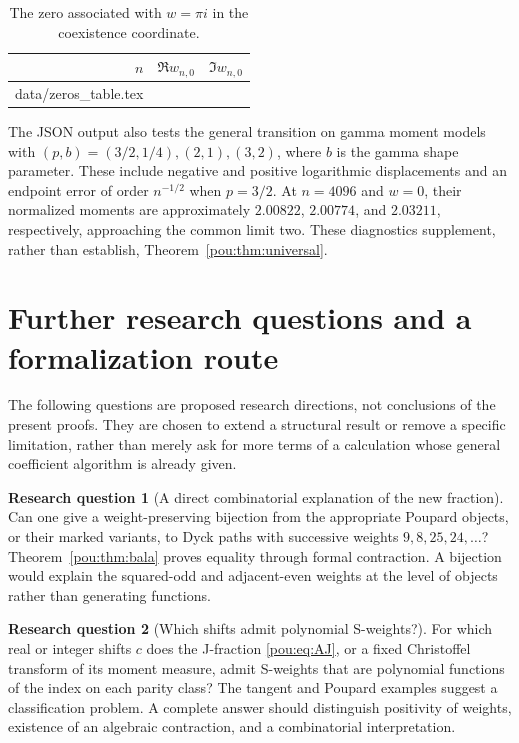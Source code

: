\documentclass[11pt]{article}
\makeatletter
\theoremstyle{definition}
\newtheorem{question}{Research question}
\theoremstyle{remark}
\newcommand{\tableinput}[1]{\@@input #1 }
\makeatother
\begin{document}
\begin{table}[htbp]
\centering
\caption{The zero associated with $w=\pi i$ in the coexistence coordinate.}
\label{pou:tab:zeros}
\begin{tabular}{rcc}
\toprule
$n$ & $\Re w_{n,0}$ & $\Im w_{n,0}$\\
\midrule
\tableinput{data/zeros_table.tex}
\bottomrule
\end{tabular}
\end{table}

The JSON output also tests the general transition on gamma moment models
with $(p,b)=(3/2,1/4),(2,1),(3,2)$, where $b$ is the gamma shape parameter.
These include negative and positive logarithmic displacements and an
endpoint error of order $n^{-1/2}$ when $p=3/2$.
At $n=4096$ and $w=0$, their normalized moments are approximately
$2.00822$, $2.00774$, and $2.03211$, respectively, approaching the common
limit two.  These diagnostics supplement, rather than establish,
Theorem~\ref{pou:thm:universal}.

\section{Further research questions and a formalization route}
\label{pou:sec:future}

The following questions are proposed research directions, not conclusions
of the present proofs.  They are chosen to extend a structural result or
remove a specific limitation, rather than merely ask for more terms of
a calculation whose general coefficient algorithm is already given.

\begin{question}[A direct combinatorial explanation of the new fraction]
Can one give a weight-preserving bijection from the appropriate Poupard
objects, or their marked variants, to Dyck paths with successive weights
$9,8,25,24,\ldots$?  Theorem~\ref{pou:thm:bala} proves equality through formal
contraction.  A bijection would explain the squared-odd and adjacent-even
weights at the level of objects rather than generating functions.
\end{question}

\begin{question}[Which shifts admit polynomial S-weights?]
For which real or integer shifts $c$ does the J-fraction
\eqref{pou:eq:AJ}, or a fixed Christoffel transform of its moment measure,
admit S-weights that are polynomial functions of the index on each parity
class?  The tangent and Poupard examples suggest a classification problem.
A complete answer should distinguish positivity of weights, existence of
an algebraic contraction, and a combinatorial interpretation.
\end{question}
\end{document}
